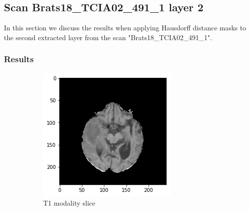 \subsection{Scan Brats18\_TCIA02\_491\_1 layer 2}
In this section we discuss the results when applying Hausdorff distance masks to the second extracted layer from the scan "Brats18\_TCIA02\_491\_1".
\subsubsection{Results}


\begin{figure}[H]
    \centering
    \begin{subfigure}[t]{.4\textwidth}
        \centering
        \includegraphics[width=\linewidth]{chapters/06_hdm/a_Brats18_TCIA02_491_1_L2/1.png}
        \caption{T1 modality slice}
    \end{subfigure}\hspace{1cm}%
    \begin{subfigure}[t]{.4\textwidth}
        \centering

\end{subfigure}
\end{figure}
